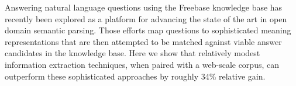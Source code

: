 Answering natural language questions using the Freebase knowledge base has recently been explored as a platform for advancing the state of the art in open domain semantic parsing. Those efforts map questions to sophisticated meaning representations that are then attempted to be matched against viable answer candidates in the knowledge base. Here we show that relatively modest information extraction techniques, when paired with a web-scale corpus, can outperform these sophisticated approaches by roughly 34\% relative gain.

